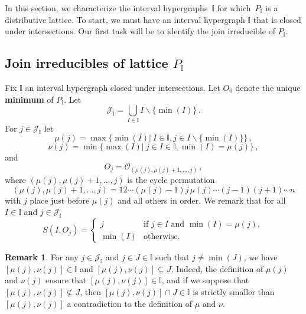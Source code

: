 \documentclass[reqno]{amsart}
\theoremstyle{definition}
\newtheorem{remark}[theorem]{Remark}
\newcommand{\ssm}{\smallsetminus} %
\newcommand{\defn}[1]{\textbf{\textsf{\color{PineGreen} #1}}} %
\newcommand{\Nantel}[1]{\todo[inline,color=red!30]{#1 \\ \hfill --- N.}}
\newcommand{\Or}{\mathcal O}  %
\newcommand{\II}{\mathbb I} %
\newcommand{\cJ}{\mathcal J} %
\begin{document}
In this section, we characterize the interval hypergraphs~$\II$ for which~$P_\II$ is a distributive lattice. To start, we must have an interval  hypergraph $\II$ that is closed under intersections.
Our first task will be to identify the join irreducible of $P_\II$.

%


\subsection{Join irreducibles of lattice $P_\II$}  
\label{subsec:irreducibles}

Fix $\II$ an interval  hypergraph closed under intersections. 
Let $O_0$ denote the unique \defn{minimum} of $P_\II$.
Let
  $$\cJ_\II=\bigcup_{I\in \II} I\ssm \{\min(I)\} \,.$$
For $j\in \cJ_\II$ let
\begin{equation}\label{eq:mu}
 \mu(j)=\max\big\{ \min(I) \big| \ I\in\II, j\in I\ssm\{\min(I)\}\big\}\,,
\end{equation}
\begin{equation}\label{eq:nu}
 \nu(j)=\min\big\{ \max(I) \big| \ j\in I\in\II, \min(I)=\mu(j)\big\}\,,
\end{equation}
and
\begin{equation}\label{eq:nu}
 O_j=\Or_{(\mu(j),\mu(j)+1,\ldots,j)}\,,
\end{equation}
where $(\mu(j),\mu(j)+1,\ldots,j)$ is the cycle permutation
  $$(\mu(j),\mu(j)+1,\ldots,j)= 12\cdots(\mu(j)-1)j\,\mu(j)\cdots (j-1) (j+1)\cdots n
  $$
with $j$ place just before $\mu(j)$ and all others in order. We remark that for all $I\in\II$ and $j\in\cJ_\II$
\begin{equation}\label{eq:sourceOj}
 	S(I,O_j)=\begin{cases}
		j& \text{if $j\in I$ and $\min(I)=\mu(j)$},\\
		\min(I)& \text{otherwise.}
	\end{cases}
\end{equation}

\begin{remark}\label{rem:munuseg}
For any $j\in \cJ_\II$ and $j\in J\in \II$ such that $j\ne\min(J)$, we have $[\mu(j),\nu(j)]\in \II$ and $[\mu(j),\nu(j)]\subseteq J$.
Indeed, the definition of $\mu(j)$ and $\nu(j)$ ensure that $[\mu(j),\nu(j)]\in \II$, and if we suppose that $[\mu(j),\nu(j)]\not\subseteq J$, then $[\mu(j),\nu(j)]\cap J\in \II$ is strictly smaller than $[\mu(j),\nu(j)]$ a contradiction to the definition of $\mu$ and $\nu$.
\end{remark}
\end{document}
